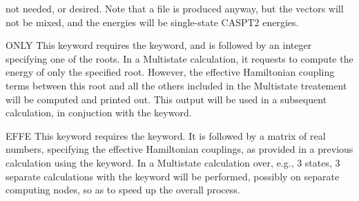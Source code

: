 \begin{keywordlist}
not needed, or desired. Note that a  file is produced anyway, but the
vectors will not be mixed, and the energies will be single-state CASPT2
energies.
\item[ONLY]
This keyword requires the  keyword, and is
followed by an integer specifying one of the roots.
In a Multistate calculation, it requests to compute the energy of only
the specified root. However, the effective Hamiltonian coupling terms
between this root and all the others included in the Multistate
treatement will be computed and printed out.
This output will be used in a subsequent calculation, in conjuction
with the  keyword.
\item[EFFE]
This keyword requires the  keyword. It is followed by
a matrix of real numbers, specifying the effective Hamiltonian
couplings, as provided in a previous calculation using the
 keyword.
In a Multistate calculation over, e.g., 3 states, 3 separate
calculations with the  keyword will be performed, possibly
on separate computing nodes, so as to speed up the overall process.

\end{keywordlist}
